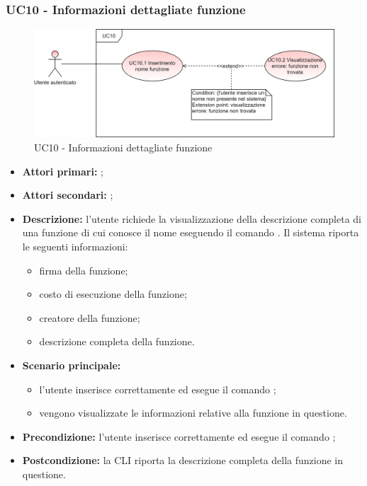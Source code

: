 \subsubsection{UC10 - Informazioni dettagliate funzione}
\begin{figure}[h]
	\centering
	\includegraphics[scale=\ucs]{./res/img/UC10.png}
	\caption {UC10 - Informazioni dettagliate funzione}
\end{figure}
\begin{itemize}
	\item \textbf{Attori primari:} \ua{};
	\item \textbf{Attori secondari:} \re{};
	\item \textbf{Descrizione:} l’utente richiede la visualizzazione della descrizione completa di una funzione di cui conosce il nome eseguendo il comando \pinfo{}. Il sistema riporta le seguenti informazioni:  
	\begin{itemize}
		\item firma della funzione;
		\item costo di esecuzione della funzione; 
		\item creatore della funzione; 
		\item descrizione completa della funzione.
	\end{itemize} 
	\item \textbf{Scenario principale:} 
	\begin{itemize}
		\item l'utente inserisce correttamente ed esegue il comando \pinfo{}; 
		\item vengono visualizzate le informazioni relative alla funzione in questione.
	\end{itemize}
	\item \textbf{Precondizione:} l'utente inserisce correttamente ed esegue il comando \pinfo{};
	\item \textbf{Postcondizione:} la CLI riporta la descrizione completa della funzione in questione.
\end{itemize}